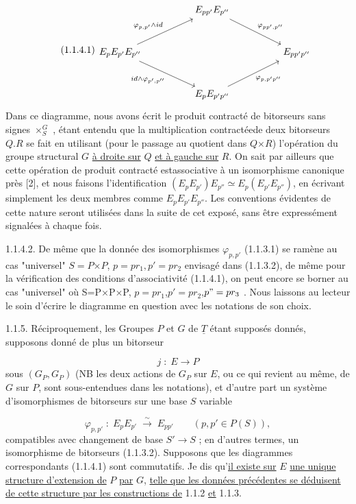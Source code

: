 \begin{equation}\tag{1.1.4.1}
\begin{tikzcd}[column sep=huge, row sep=large]
 & E_{pp'}E_{p''} \arrow[dr, "{\varphi_{pp',p''}}"] & \\
E_{p}E_{p'}E_{p''} \arrow[ur, "{\varphi_{p,p'}\wedge id}"] \arrow[dr, "{id\wedge\varphi_{p',p''}}"'] & & E_{pp'p''} \\
 & E_{p}E_{p'p''} \arrow[ur, "{\varphi_{p,p'p''}}"'] &
\end{tikzcd}
\end{equation}
Dans ce diagramme, nous avons écrit le produit contracté de bitorseurs sans signes $\times^{G}_{S}$ , étant entendu que la multiplication contractéede deux bitorseurs $Q.R$ se fait en utilisant (pour le passage au quotient dans $Q$$\times$$R$) l'opération du groupe structural $G$ \underline{à droite sur} $Q$ \underline{et à gauche sur} $R$. On sait par ailleurs que cette opération de produit contracté estassociative à un isomorphisme canonique près [2], et nous faisons l'identification $(E_{p}E_{p'})E_{p''} \simeq E_{p}(E_{p'}E_{p''})$, en écrivant simplement les deux membres comme $E_{p}E_{p'}E_{p''}$. Les conventions évidentes de cette nature seront utilisées dans la suite de cet exposé, sans être expressément signalées à chaque fois.

1.1.4.2.  De même que la donnée des isomorphismes $\varphi_{p,p'}$ (1.1.3.1) se ramène au cas "universel" $S=P$$\times$$P$, $p=pr_1,p' = pr_2$ envisagé dans (1.1.3.2), de même
pour la vérification des conditions d'associativité (1.1.4.1), on peut encore se borner au cas "universel" où S=P$\times$P$\times$P, $p=pr_1$,$p'=pr_2$,$p"=pr_3$ . Nous laissons au lecteur le soin d'écrire le diagramme en question avec les notations de son choix.

1.1.5.  Réciproquement, les Groupes $P$ et $G$ de $\underline{T}$ étant supposés donnés, supposons donné de plus un bitorseur

\begin{equation}\tag{1.1.5.1}
j \; : \; E \longrightarrow P
\end{equation}
sous $(G_{P},G_{P})$ (NB les deux actions de $G_{P}$ sur $E$, ou ce qui revient au même, de $G$ sur $P$, sont sous-entendues dans les notations), et d'autre part un système d'isomorphismes de bitorseurs sur une base $S$ variable

\begin{equation}\tag{1.1.5.2}
\varphi_{p,p'} \; : \; E_{p}E_{p'} \;\overset{\sim}{\longrightarrow}\; E_{pp'} \qquad (p,p' \in P(S)),
\end{equation}
compatibles avec changement de base $S' \longrightarrow S$ ; en d'autres termes, un isomorphisme de bitorseurs (1.1.3.2). Supposons que les diagrammes correspondants (1.1.4.1) sont commutatifs. Je dis qu'\underline{il existe sur} $E$ \underline{une unique structure d'extension de} $P$ \underline{par} $G$, \underline{telle que les données précédentes se déduisent de cette structure par les constructions de} 1.1.2 \underline{et} 1.1.3.

